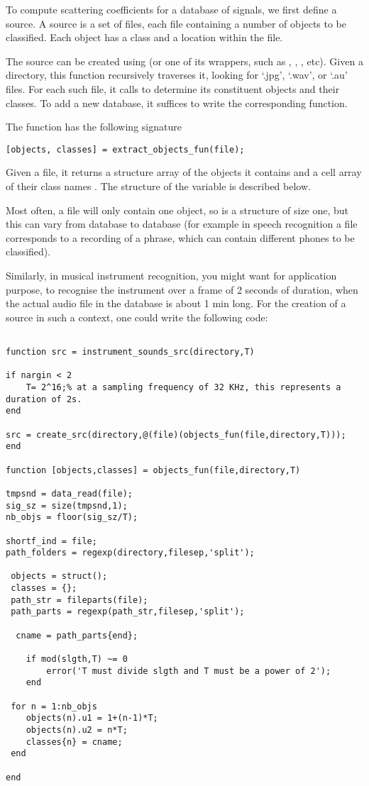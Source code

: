 \documentclass{article}
\begin{document}
To compute scattering coefficients for a database of signals, we first define a source. A source is a set of files, each file containing a number of objects to be classified. Each object has a class and a location within the file.

The source can be created using  (or one of its wrappers, such as , , , etc). Given a directory, this function recursively traverses it, looking for `.jpg', `.wav', or `.au' files. For each such file, it calls  to determine its constituent objects and their classes. To add a new database, it suffices to write the corresponding  function.

The  function has the following signature
\begin{lstlisting}
[objects, classes] = extract_objects_fun(file);
\end{lstlisting}
Given a file, it returns a structure array  of the objects it contains and a cell array of their class names . The structure of the  variable is described below.

Most often, a file will only contain one object, so  is a  structure of size one, but this can vary from database to database (for example in speech recognition a file corresponds to a recording of a phrase, which can contain different phones to be classified).

Similarly, in musical instrument recognition, you might want for application purpose, to recognise the instrument over a
frame of 2 seconds of duration, when the actual audio file in the database is about 1 min long.  For the creation
of a source in such a context, one could write the following code:

\begin{lstlisting}

function src = instrument_sounds_src(directory,T)

if nargin < 2
    T= 2^16;% at a sampling frequency of 32 KHz, this represents a duration of 2s. 
end

src = create_src(directory,@(file)(objects_fun(file,directory,T)));
end

function [objects,classes] = objects_fun(file,directory,T)

tmpsnd = data_read(file);
sig_sz = size(tmpsnd,1);
nb_objs = floor(sig_sz/T);

shortf_ind = file;
path_folders = regexp(directory,filesep,'split');

 objects = struct();
 classes = {};
 path_str = fileparts(file);
 path_parts = regexp(path_str,filesep,'split');
    
  cname = path_parts{end};
   
    if mod(slgth,T) ~= 0
        error('T must divide slgth and T must be a power of 2');
    end
     
 for n = 1:nb_objs
    objects(n).u1 = 1+(n-1)*T;
    objects(n).u2 = n*T;
    classes{n} = cname;
 end

end

\end{lstlisting}
\end{document}
